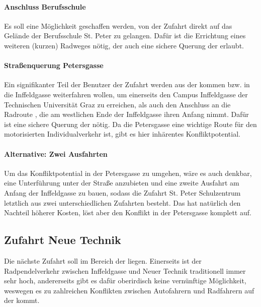 \paragraph{Anschluss Berufsschule}
Es soll eine Möglichkeit geschaffen werden, von der Zufahrt direkt auf das Gelände der Berufsschule St. Peter zu gelangen. Dafür ist die Errichtung eines weiteren (kurzen) Radweges nötig, der auch eine sichere Querung der  erlaubt.

\paragraph{Straßenquerung Petersgasse}
Ein signifikanter Teil der Benutzer der Zufahrt werden aus der  kommen bzw. in die Inffeldgasse weiterfahren wollen, um einerseits den Campus Inffeldgasse der Technischen Universität Graz zu erreichen, als auch den Anschluss an die Radroute , die am westlichen Ende der Inffeldgasse ihren Anfang nimmt. Dafür ist eine sichere Querung der  nötig. Da die Petersgasse eine wichtige Route für den motorisierten Individualverkehr ist, gibt es hier inhärentes Konfliktpotential.

\paragraph{Alternative: Zwei Ausfahrten}
Um das Konfliktpotential in der Petersgasse zu umgehen, wäre es auch denkbar, eine Unterführung unter der Straße anzubieten und eine zweite Ausfahrt am Anfang der Inffeldgasse zu bauen, sodass die Zufahrt St. Peter Schulzentrum letztlich aus zwei unterschiedlichen Zufahrten besteht. Das hat natürlich den Nachteil höherer Kosten, löst aber den Konflikt in der Petersgasse komplett auf.

\subsection{Zufahrt Neue Technik}
Die nächste Zufahrt soll im Bereich der  liegen. Einerseits ist der Radpendelverkehr zwischen Inffeldgasse und Neuer Technik traditionell immer sehr hoch, andererseits gibt es dafür oberirdisch keine vernünftige Möglichkeit, weswegen es zu zahlreichen Konflikten zwischen Autofahrern und Radfahrern auf der  kommt.

